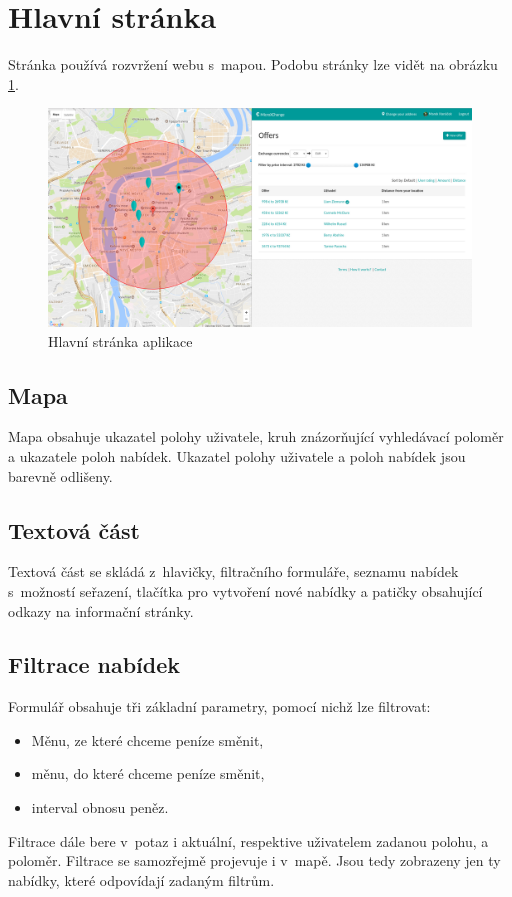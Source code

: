 \section{Hlavní stránka}

\label{nur:homepage}
Stránka používá rozvržení webu s~mapou. Podobu stránky lze vidět na obrázku \ref{fig:tur:homepage}.

\begin{figure}[!h]
    \centering
    \includegraphics[width=1.0\textwidth]{media/tur/homepage.png}
    \caption{Hlavní stránka aplikace}
    \label{fig:tur:homepage}
\end{figure}

\subsection{Mapa}
Mapa obsahuje ukazatel polohy uživatele, kruh znázorňující vyhledávací poloměr a ukazatele poloh nabídek. Ukazatel polohy uživatele a poloh nabídek jsou barevně odlišeny.

\subsection{Textová část}
Textová část se skládá z~hlavičky, filtračního formuláře, seznamu nabídek s~možností seřazení, tlačítka pro vytvoření nové nabídky a patičky obsahující odkazy na informační stránky.

\subsection{Filtrace nabídek}
Formulář obsahuje tři základní parametry, pomocí nichž lze filtrovat:
\begin{itemize}
	\item Měnu, ze které chceme peníze směnit,
	\item měnu, do které chceme peníze směnit,
	\item interval obnosu peněz.
\end{itemize}
Filtrace dále bere v~potaz i aktuální, respektive uživatelem zadanou polohu, a poloměr. Filtrace se samozřejmě projevuje i v~mapě. Jsou tedy zobrazeny jen ty nabídky, které odpovídají zadaným filtrům.


